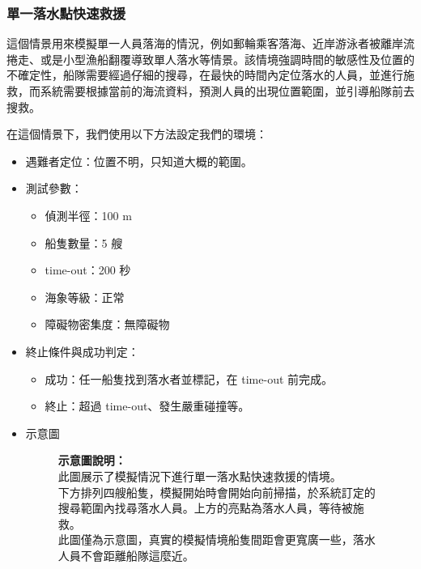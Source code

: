 \documentclass[12pt,a4paper]{article}
\begin{document}
\subsubsection{單一落水點快速救援}
這個情景用來模擬單一人員落海的情況，例如郵輪乘客落海、近岸游泳者被離岸流捲走、或是小型漁船翻覆導致單人落水等情景。該情境強調時間的敏感性及位置的不確定性，船隊需要經過仔細的搜尋，在最快的時間內定位落水的人員，並進行施救，而系統需要根據當前的海流資料，預測人員的出現位置範圍，並引導船隊前去搜救。
\\ \par
在這個情景下，我們使用以下方法設定我們的環境：
\begin{itemize}
    \item 遇難者定位：位置不明，只知道大概的範圍。
    \item 測試參數：
    \begin{itemize}
        \item 偵測半徑：100 m
        \item 船隻數量：5 艘
        \item time-out：200 秒
        \item 海象等級：正常
        \item 障礙物密集度：無障礙物
    \end{itemize}
    \item 終止條件與成功判定：
    \begin{itemize}
        \item 成功：任一船隻找到落水者並標記，在 time-out 前完成。
        \item 終止：超過 time-out、發生嚴重碰撞等。
    \end{itemize}
    \item 示意圖
	\begin{figure}[h]
	    \centering
	    \begin{minipage}[t]{0.55\textwidth}
	        \vspace{1cm} 
	        \textbf{示意圖說明：}\\
	        此圖展示了模擬情況下進行單一落水點快速救援的情境。\\
	        下方排列四艘船隻，模擬開始時會開始向前掃描，於系統訂定的搜尋範圍內找尋落水人員。上方的亮點為落水人員，等待被施救。\\
		此圖僅為示意圖，真實的模擬情境船隻間距會更寬廣一些，落水人員不會距離船隊這麼近。
	    \end{minipage}
	    \hfill
	    \begin{minipage}[t]{0.4\textwidth}
	        \vspace{0pt}

\end{minipage}
\end{figure}
\end{itemize}
\end{document}
